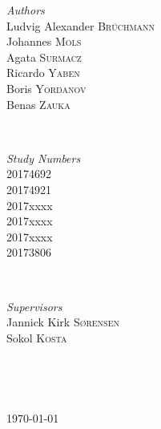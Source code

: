 \documentclass[12p]{article}
\begin{document}
\begin{titlepage}
		\begin{minipage}{0.4\textwidth}
			\begin{flushleft} \large
				\emph{Authors}\\
				Ludvig Alexander \textsc{Brüchmann} \\
				Johannes \textsc{Mols} \\
				Agata \textsc{Surmacz} \\
				Ricardo \textsc{Yaben} \\
				Boris \textsc{Yordanov} \\
				Benas \textsc{Zauka} \\
			\end{flushleft}
		\end{minipage}
		~
		\begin{minipage}{0.4\textwidth}
			\begin{flushright} \large
				\emph{Study Numbers} \\
				20174692 \\
				20174921 \\
				2017xxxx \\
				2017xxxx \\
				2017xxxx \\
				20173806 \\
			\end{flushright}
		\end{minipage}\\[0.5cm]
		 
		 
		\begin{minipage}{0.4\textwidth}
			\begin{flushleft} \large
				\emph{Supervisors}\\
				Jannick Kirk \textsc{Sørensen} \\
				Sokol \textsc{Kosta} \\
			\end{flushleft}
		\end{minipage}
		~
		\begin{minipage}{0.4\textwidth}
			\begin{flushright} \large
			\end{flushright}
		\end{minipage}\\[0.5cm]
		
			
		\vfill\vfill\vfill %
			
		{\large\today} %
			
		\end{titlepage}
		
\end{document}
